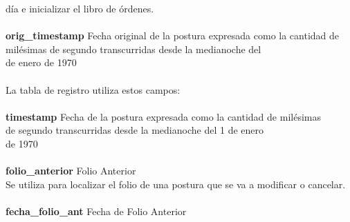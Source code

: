 \documentclass[11pt]{article}
\numberwithin{equation}{section} %
\begin{document}
\begin{tabbing}
día e inicializar el libro de órdenes.\\
\\
\textbf{orig\_timestamp} \> Fecha original de la postura expresada como la cantidad de\\
\> milésimas de segundo transcurridas desde la medianoche del\\
 de enero de 1970\\
\\
La tabla de registro utiliza estos campos:\\
\\
\textbf{timestamp} \> Fecha de la postura expresada como la cantidad de milésimas\\
\> de segundo transcurridas desde la medianoche del 1 de enero\\
\>de 1970\\
\\
\textbf{folio\_anterior} \> Folio Anterior\\
Se utiliza para localizar el folio de una postura que se va a modificar o cancelar.\\
\\
\textbf{fecha\_folio\_ant} \> Fecha de Folio Anterior\\
\end{tabbing}
\end{document}
